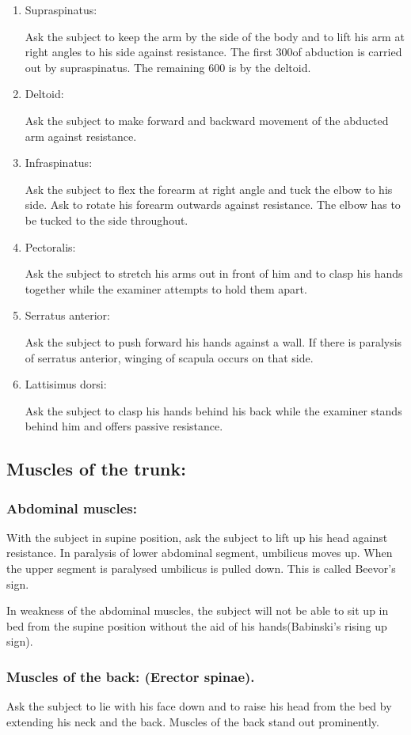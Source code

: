 \documentclass[a4paper,12pt]{book}
\begin{document}
\begin{enumerate}
{The subject is asked to extend the flexed forearm against resistance.
}
\item{ Supraspinatus: 
\par
Ask the subject to keep the arm by the side of the body and to lift his arm at right angles to his side against resistance. The first 300of abduction is carried out by supraspinatus. The remaining 600 is by the deltoid.
}
\item{ Deltoid: 
\par
Ask the subject to make forward and backward movement of the abducted arm against resistance.
}
\item{ Infraspinatus: 
\par
Ask the subject to flex the forearm at right angle and tuck the elbow to his side. Ask to rotate his forearm outwards against resistance. The elbow has to be tucked to the side throughout.
}
\item{ Pectoralis: 
\par
Ask the subject to stretch his arms out in front of him and to clasp his hands together while the examiner attempts to hold them apart.
}
\item{ Serratus anterior: 
\par
Ask the subject to push forward his hands against a wall. If there is paralysis of serratus anterior, winging of scapula occurs on that side.
}
\item{ Lattisimus dorsi: 
\par
Ask the subject to clasp his hands behind his back while the examiner stands behind him and offers passive resistance.
}	
\end{enumerate}
\subsection*{Muscles	of	the	trunk:}	
\subsubsection*{Abdominal muscles:}
	With the subject in supine position, ask the subject to lift up his head against resistance. In paralysis of lower abdominal segment, umbilicus moves up. When the upper segment is paralysed umbilicus is pulled down. This is called Beevor's sign.
	\par
	In weakness of the abdominal muscles, the subject will not be able to sit up in bed from the supine position without the aid of his hands(Babinski’s rising up sign).
	\subsubsection*{Muscles of the back: (Erector spinae).}
	Ask the subject to lie with his face down and to raise his head from the bed by extending his neck and the back. Muscles of the back stand out prominently.
\end{document}

